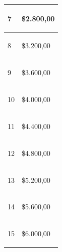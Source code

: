 \begin{spacing}{0.1}
\begin{center}
\begin{tabular}{ |p{3.5cm}| p{3cm}|}
\begin{center}7 \end{center}    & \begin{center} \$2.800,00\end{center}  \\ \hline

\begin{center}8 \end{center}    & \begin{center} \$3.200,00 \end{center} \\ \hline

\begin{center}9 \end{center}    & \begin{center} \$3.600,00 \end{center} \\ \hline

\begin{center}10 \end{center}    & \begin{center} \$4.000,00 \end{center} \\ \hline

\begin{center}11 \end{center}    & \begin{center} \$4.400,00 \end{center} \\ \hline

\begin{center}12 \end{center}    & \begin{center} \$4.800,00 \end{center} \\ \hline

\begin{center}13 \end{center}    & \begin{center} \$5.200,00 \end{center} \\ \hline

\begin{center}14 \end{center}    & \begin{center} \$5.600,00 \end{center} \\ \hline

\begin{center}15 \end{center}    & \begin{center} \$6.000,00 \end{center} \\ \hline
\end{tabular}
\end{center}
\end{spacing}

